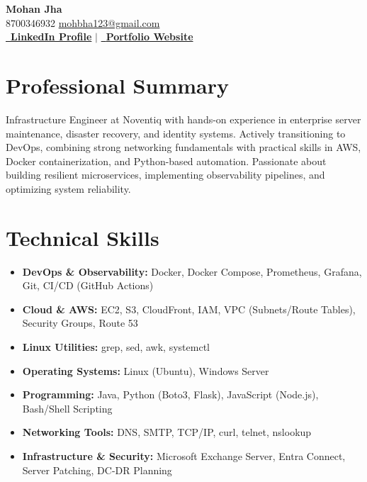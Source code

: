 \documentclass[11pt, a4paper]{article}
\begin{document}
\begin{center}
    {\Huge \textbf{\textcolor{primary}{Mohan Jha}}} \\ \vspace{6pt}
    \small \textcolor{primary}{\faPhone} 8700346932 \quad \textcolor{primary}{\faEnvelope} \href{mailto:mohbha123@gmail.com}{mohbha123@gmail.com} \\ \vspace{4pt}
    \href{https://www.linkedin.com/in/mohanjha1/}{\textcolor{primary}{\faLinkedin\ \textbf{LinkedIn Profile}}} \quad \textcolor{muted}{$|$} \quad
    \href{https://d84o05v9b2k31.cloudfront.net/}{\textcolor{primary}{\faGlobe\ \textbf{Portfolio Website}}}
\end{center}
\vspace{2pt}

\section{Professional Summary}
\vspace{2pt}
\small Infrastructure Engineer at Noventiq with hands-on experience in enterprise server maintenance, disaster recovery, and identity systems. Actively transitioning to DevOps, combining strong networking fundamentals with practical skills in AWS, Docker containerization, and Python-based automation. Passionate about building resilient microservices, implementing observability pipelines, and optimizing system reliability.
\vspace{4pt}

\section{Technical Skills}
\vspace{2pt}
\begin{itemize}[leftmargin=0.15in, label={}, itemsep=1pt, parsep=0pt]
    \small
    \item \textbf{DevOps \& Observability:} Docker, Docker Compose, Prometheus, Grafana, Git, CI/CD (GitHub Actions)
    \item \textbf{Cloud \& AWS:} EC2, S3, CloudFront, IAM, VPC (Subnets/Route Tables), Security Groups, Route 53
    \item \textbf{Linux Utilities:} grep, sed, awk, systemctl
    \item \textbf{Operating Systems:} Linux (Ubuntu), Windows Server
    \item \textbf{Programming:} Java, Python (Boto3, Flask), JavaScript (Node.js), Bash/Shell Scripting
    \item \textbf{Networking Tools:} DNS, SMTP, TCP/IP, curl, telnet, nslookup
    \item \textbf{Infrastructure \& Security:} Microsoft Exchange Server, Entra Connect, Server Patching, DC-DR Planning
\end{itemize}
\vspace{-4pt}
\end{document}
